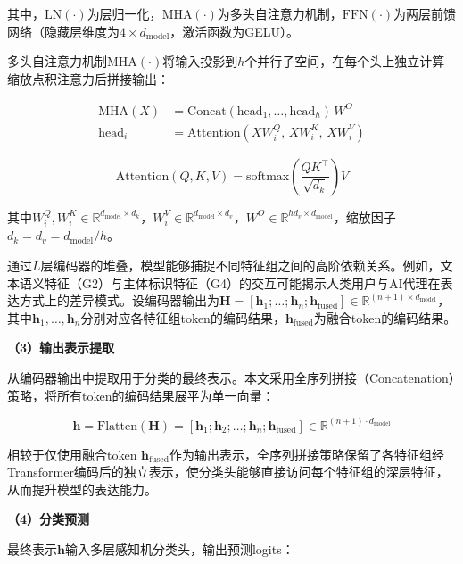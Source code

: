 其中，$\text{LN}(\cdot)$为层归一化，$\text{MHA}(\cdot)$为多头自注意力机制，$\text{FFN}(\cdot)$为两层前馈网络（隐藏层维度为$4 \times d_{\text{model}}$，激活函数为GELU）。

多头自注意力机制$\text{MHA}(\cdot)$\cite{vaswani2017attention}将输入投影到$h$个并行子空间，在每个头上独立计算缩放点积注意力后拼接输出：

\begin{align}
\text{MHA}(X) &= \text{Concat}(\text{head}_1, \ldots, \text{head}_h)\,W^O \\
\text{head}_i &= \text{Attention}(XW_i^Q,\, XW_i^K,\, XW_i^V)
\end{align}

\begin{equation}
\text{Attention}(Q,K,V) = \text{softmax}\!\left(\frac{QK^\top}{\sqrt{d_k}}\right)V
\end{equation}

其中$W_i^Q, W_i^K \in \mathbb{R}^{d_{\text{model}} \times d_k}$，$W_i^V \in \mathbb{R}^{d_{\text{model}} \times d_v}$，$W^O \in \mathbb{R}^{hd_v \times d_{\text{model}}}$，缩放因子$d_k = d_v = d_{\text{model}}/h$。

通过$L$层编码器的堆叠，模型能够捕捉不同特征组之间的高阶依赖关系。例如，文本语义特征（G2）与主体标识特征（G4）的交互可能揭示人类用户与AI代理在表达方式上的差异模式。设编码器输出为$\mathbf{H} = [\mathbf{h}_1; \ldots; \mathbf{h}_n; \mathbf{h}_{\text{fused}}] \in \mathbb{R}^{(n+1) \times d_{\text{model}}}$，其中$\mathbf{h}_1,\ldots,\mathbf{h}_n$分别对应各特征组token的编码结果，$\mathbf{h}_{\text{fused}}$为融合token的编码结果。

\textbf{（3）输出表示提取}

从编码器输出中提取用于分类的最终表示。本文采用全序列拼接（Concatenation）策略，将所有token的编码结果展平为单一向量：

\begin{equation}
\mathbf{h} = \text{Flatten}(\mathbf{H}) = [\mathbf{h}_1; \mathbf{h}_2; \ldots; \mathbf{h}_n; \mathbf{h}_{\text{fused}}] \in \mathbb{R}^{(n+1) \cdot d_{\text{model}}}
\end{equation}

相较于仅使用融合token $\mathbf{h}_{\text{fused}}$作为输出表示，全序列拼接策略保留了各特征组经Transformer编码后的独立表示，使分类头能够直接访问每个特征组的深层特征，从而提升模型的表达能力。

\textbf{（4）分类预测}

最终表示$\mathbf{h}$输入多层感知机分类头，输出预测logits：


